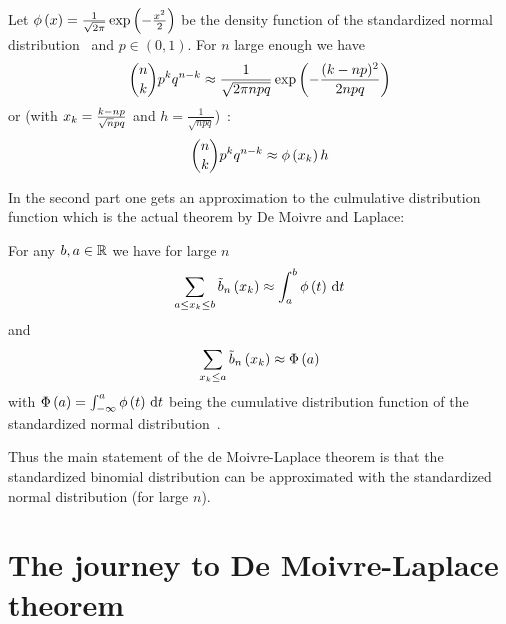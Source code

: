 
\begin{theorem}
  Let $\phi\left( {x} \right)=\frac{1}{\sqrt{2\pi}}\exp\left( {-\frac{x^2}2} \right)$ be the density function of the standardized normal distribution~\cite[p. 48]{georgii} and $p\in(0,1)$. For $n$ large enough we have~\cite[p. 65]{irle}
  \begin{align}
    \binom nk p^k q^{n-k} \approx \frac 1{\sqrt{2\pi npq}} \exp\left( {-\frac{(k-np)^2}{2npq}} \right)
  \end{align}
  or (with $x_{k}=\frac{k-np}{\sqrt npq}$ and $h=\frac1{\sqrt{npq}}$)~\cite[p. 133]{georgii}:
  \begin{align}
    \binom nk p^k q^{n-k} \approx \phi\left( {x_{k}} \right) h
  \end{align}
\end{theorem}

In the second part one gets an approximation to the culmulative distribution function which is the actual theorem by De Moivre and Laplace:


\begin{theorem}
  For any $b,a \in \mathbb R$ we have for large $n$~\cite[p. 136]{georgii}\cite[p. 67]{irle}
  \begin{align}
    \sum_{a \le x_{k}\le b} \tilde b_{n}\left({x_{k}}\right) \approx \int_a^b \phi\left( {t} \right) \,\mathrm d{t}
  \end{align}
  and
  \begin{align}
    \sum_{x_{k} \le a} \tilde b_{n}\left({x_{k}}\right) \approx \Phi\left( {a} \right)
  \end{align}
  with $\Phi\left( {a} \right) = \int_{-\infty}^a \phi\left( {t} \right) \,\mathrm d{t}$ being the cumulative distribution function of the standardized normal distribution~\cite[p. 134]{georgii}.
\end{theorem}

Thus the main statement of the de Moivre-Laplace theorem is that the standardized binomial distribution can be approximated with the standardized normal distribution (for large $n$).

\section{The journey to De Moivre-Laplace theorem}

